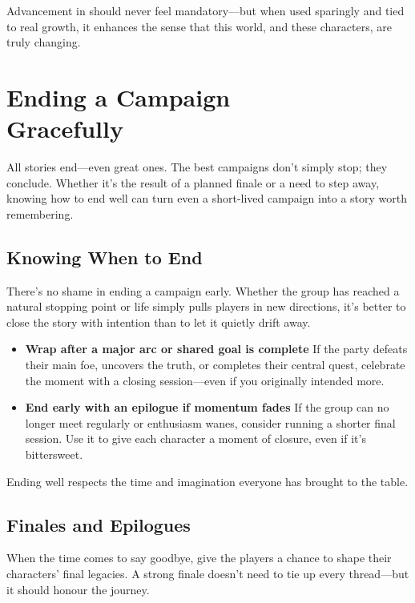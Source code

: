 Advancement in \wyrd should never feel mandatory—but when used sparingly and tied to real growth, it enhances the sense that this world, and these characters, are truly changing.

\section[Ending a Campaign Gracefully]{Ending a Campaign\\ Gracefully}

All stories end—even great ones. The best campaigns don’t simply stop; they conclude. Whether it’s the result of a planned finale or a need to step away, knowing how to end well can turn even a short-lived campaign into a story worth remembering.

\subsection*{Knowing When to End}

There’s no shame in ending a campaign early. Whether the group has reached a natural stopping point or life simply pulls players in new directions, it’s better to close the story with intention than to let it quietly drift away.

\begin{itemize}
    \item \textbf{Wrap after a major arc or shared goal is complete}  
    If the party defeats their main foe, uncovers the truth, or completes their central quest, celebrate the moment with a closing session—even if you originally intended more.

    \item \textbf{End early with an epilogue if momentum fades}  
    If the group can no longer meet regularly or enthusiasm wanes, consider running a shorter final session. Use it to give each character a moment of closure, even if it’s bittersweet.
\end{itemize}

Ending well respects the time and imagination everyone has brought to the table.

\subsection*{Finales and Epilogues}

When the time comes to say goodbye, give the players a chance to shape their characters’ final legacies. A strong finale doesn’t need to tie up every thread—but it should honour the journey.

